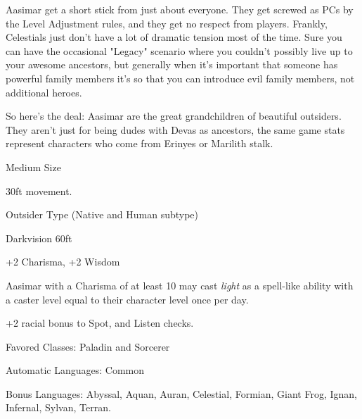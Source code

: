 
Aasimar get a short stick from just about everyone. They get screwed as PCs by the Level Adjustment rules, and they get no respect from players. Frankly, Celestials just don't have a lot of dramatic tension most of the time. Sure you can have the occasional "Legacy" scenario where you couldn't possibly live up to your awesome ancestors, but generally when it's important that someone has powerful family members it's so that you can introduce evil family members, not additional heroes.

So here's the deal: Aasimar are the great grandchildren of beautiful outsiders. They aren't just for being dudes with Devas as ancestors, the same game stats represent characters who come from Erinyes or Marilith stalk. 

\begin{itemize*}
\item Medium Size
\item 30ft movement.
\item Outsider Type (Native and Human subtype)
\item Darkvision 60ft
\item +2 Charisma, +2 Wisdom
\item Aasimar with a Charisma of at least 10 may cast \textit{light} as a spell-like ability with a caster level equal to their character level once per day.
\item +2 racial bonus to Spot, and Listen checks.
\item Favored Classes: Paladin and Sorcerer
\item Automatic Languages: Common
\item Bonus Languages: Abyssal, Aquan, Auran, Celestial, Formian, Giant Frog, Ignan, Infernal, Sylvan, Terran. 
\end{itemize*}
